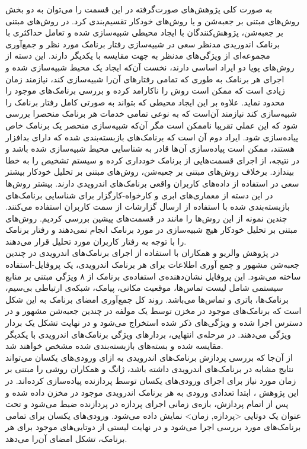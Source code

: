به صورت کلی پژوهش‌های صورت‌گرفته  در این قسمت را می‌توان به دو بخش روش‌های مبتنی بر جعبه‌شن و یا روش‌های خودکار تقسیم‌بندی کرد. در روش‌های مبتنی بر جعبه‌شن، پژوهش‌کنندگان با ایجاد محیطی شبیه‌سازی شده و تعامل حداکثری با برنامک اندوریدی مدنظر سعی در شبیه‌سازی رفتار برنامک مورد نظر و جمع‌آوری مجموعه‌ای از ویژگی‌های مدنظر به جهت مقایسه‌ با یکدیگر دارند. این دسته از روش‌های پویا دو ایراد اساسی دارند، نخست آن‌که ایجاد یک محیط شبیه‌سازی شده و اجرای هر برنامک به طوری که تمامی رفتار‌های آن‌‌را شبیه‌سازی کند، نیازمند زمان زیادی است که ممکن است روش را ناکارامد کرده و بررسی برنامک‌های موجود را محدود نماید. علاوه بر این ایجاد محیطی که بتواند به صورتی کامل رفتار برنامک را شبیه‌سازی کند نیازمند آن‌است که به نوعی تمامی خدمات هر برنامک منحصرا بررسی شود که این عملی تقریبا ناممکن است مگر آن‌که شبیه‌سازی منحصر یک برنامک خاص پیاده‌سازی شود. ایراد دوم آن‌ است که برنامک‌های بازبسته‌بندی شده که دارای بدافزار هستند، ممکن است پیاده‌سازی آن‌ها قادر به شناسایی محیط شبیه‌سازی شده باشد و در نتیجه، از اجرای قسمت‌هایی از برنامک خودداری کرده و سیستم تشخیص را به خطا بیندازد. برخلاف روش‌های مبتنی بر جعبه‌شن، روش‌های مبتنی بر تحلیل خودکار بیشتر سعی در استفاده از داده‌های کاربران واقعی برنامک‌های اندرویدی دارند. بیشتر روش‌ها در این دسته از معماری‌های ابری و کارخواه-کارگزار برای شناسایی برنامک‌های بازبسته‌بندی شده با استفاده از ارسال گزارشات از سمت کاربران استفاده می‌کنند. چندین نمونه از این روش‌ها را مانند  در قسمت‌های پیشین بررسی کردیم. روش‌های مبتنی بر تحلیل خود‌کار هیچ شبیه‌سازی در مورد برنامک انجام نمی‌دهند و رفتار برنامک را با توجه به رفتار کاربران مورد تحلیل قرار می‌دهند.\\
در پژوهش والریو و همکاران با استفاده از اجرای برنامک‌های اندرویدی در چندین جعبه‌شن مشهور و چمع آوری اطلاعات برای هر برنامک اندرویدی، یک پروفایل-استفاده ساخته می‌شود. این پروفایل نشان‌دهنده‌ی استفاده‌ی برنامک از ۸ ویژگی مبتنی بر منابع سیستمی شامل لیست‌ تماس‌ها، موقعیت‌ مکانی، پیامک‌، شبکه‌ی ارتباطی‌ بی‌سیم، برنامک‌ها، باتری و تماس‌ها می‌باشد. روند کل جمع‌آوری امضا‌ی برنامک به این شکل است که برنامک‌های موجود در مخزن توسط یک مولفه در چندین جعبه‌شن مشهور و در دسترس اجرا شده و ویژگی‌های ذکر شده استخراج می‌شود و در نهایت تشکل یک بردار ویژگی می‌دهند. در مرحله‌ی انتهایی، بردار‌های ویژگی برنامک‌های اندرویدی با یکدیگر مقایسه شده و بسته‌های بازبسته‌بندی شده مشخص خواهند شد.\\
از آن‌جا که بررسی پردازش‌ برنامک‌های اندرویدی به ازای ورودی‌های یکسان می‌تواند نتایج مشابه در برنامک‌های اندرویدی داشته باشد، ژانگ و همکاران روشی را مبتنی بر زمان مورد نیاز برای اجرای ورودی‌های یکسان توسط پردازنده پیاده‌سازی کرده‌اند. در این پژوهش ، ابتدا تعدادی ورودی به هر برنامک اندرویدی موجود در مخزن داده شده و پس از اتمام پردازش، بازه‌ی زمانی اجرای پردازه در پردازنده ضبط می‌شود و تحت عنوان یک دوتایی <پردازه, زمان> نمایش داده می‌شود. ورودی‌های یکسان برای تمامی برنامک‌های مورد بررسی اجرا می‌شود و در نهایت لیستی از دوتایی‌های موجود برای هر برنامک، تشکل امضای آن‌‌را می‌دهد. \\
